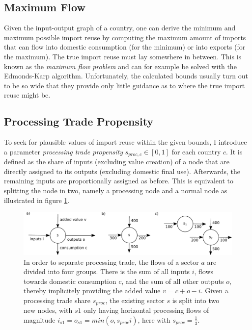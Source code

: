 \documentclass[english]{uzhpub}
\begin{document}
\subsection{Maximum Flow}
Given the input-output graph of a country, one can derive the minimum and maximum possible import reuse by computing the maximum amount of imports that can flow into domestic consumption (for the minimum) or into exports (for the maximum). The true import reuse must lay somewhere in between. This is known as the \emph{maximum flow problem} and can for example be solved with the Edmonds-Karp algorithm. \citep{edmonds1972theoretical} Unfortunately, the calculated bounds usually turn out to be so wide that they provide only little guidance as to where the true import reuse might be.

\subsection{Processing Trade Propensity}
To seek for plausible values of import reuse within the given bounds, I introduce a parameter \emph{processing trade propensity} $s_{proc,c} \in [0,1]$ for each country $c$. It is defined as the share of inputs (excluding value creation) of a node that are directly assigned to its outputs (excluding domestic final use). Afterwards, the remaining inputs are proportionally assigned as before. This is equivalent to splitting the node in two, namely a processing node and a normal node as illustrated in figure \ref{fig:sketch}.

\begin{figure}
\centering
\includegraphics[scale=0.8]{../results/sketch}
\caption{In order to separate processing trade, the flows of a sector $a$ are divided into four groups. There is the sum of all inputs $i$, flows towards domestic consumption $c$, and the sum of all other outputs $o$, thereby implicitely providing the added value $v = c + o - i$. Given a processing trade share $s_{proc}$, the existing sector $s$ is split into two new nodes, with $s1$ only having horizontal processing flows of magnitude $i_{s1}=o_{s1}=min(o, s_{proc} i)$, here with $s_{proc}=\frac{1}{3}$.}\label{fig:sketch}
\end{figure}
\end{document}
